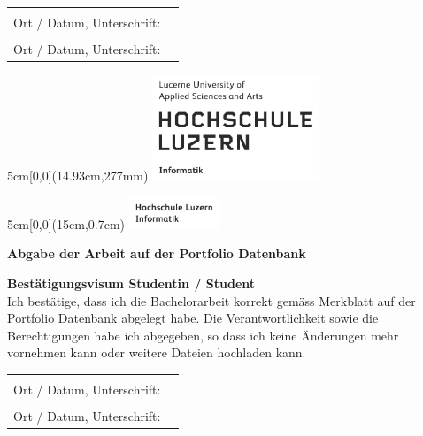 \vspace{1em}

\noindent
\begin{tabularx}{\textwidth}{@{}lX}
	&\\
	Ort / Datum, Unterschrift: &  \\
	\cline{2-2}
	&\\[0.5cm]
	Ort / Datum, Unterschrift: &  \\
	\cline{2-2}
\end{tabularx}

\begin{textblock*}{5cm}[0,0](14.93cm,277mm)
	\includegraphics[keepaspectratio,width=5cm]{img/HSLU_Logo}
\end{textblock*}

\newpage

\begin{textblock*}{5cm}[0,0](15cm,0.7cm)
	\includegraphics[keepaspectratio,width=2.7cm]{img/HSLU_Logo_Header}
\end{textblock*}

\noindent
\textbf{Abgabe der Arbeit auf der Portfolio Datenbank}

\vspace{0.5em}

\noindent
\textbf{Bestätigungsvisum Studentin / Student}
\\
\noindent
Ich bestätige, dass ich die Bachelorarbeit korrekt gemäss Merkblatt auf der Portfolio Datenbank abgelegt habe. Die Verantwortlichkeit sowie die Berechtigungen habe ich abgegeben, so dass ich keine Änderungen mehr vornehmen kann oder weitere Dateien hochladen kann.

\vspace{0.7em}

\noindent
\begin{tabularx}{\textwidth}{@{}lX}
	&\\
	Ort / Datum, Unterschrift: &  \\
	\cline{2-2}
	&\\[0.5cm]
	Ort / Datum, Unterschrift: &  \\
	\cline{2-2}
\end{tabularx}

